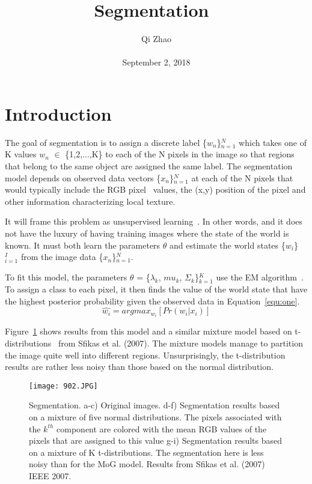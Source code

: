 \documentclass[10pt,twocolumn,letterpaper]{article}
\begin{document}
\title{Segmentation~\cite{Long2017Fully}}
\author{Qi Zhao\\\\September 2, 2018}

\maketitle
\section{Introduction}
 The goal of segmentation is to assign a discrete label \{$w_n$\}$^N_{n=1}$ which takes one of K values $w_n$ $\in$ \{1,2,...,K\} to each of the N pixels in the image so that regions that belong to the same object are assigned the same label. The segmentation model depends on observed data vectors \{$x_n$\}$^N_{n=1}$ at each of the N pixels that would typically include the RGB pixel~\cite{Kester2013Image} values, the (x,y) position of the pixel and other information characterizing local texture.

 It will frame this problem as unsupervised learning~\cite{Hofmann2001Unsupervised}. In other words, and it does not have the luxury of having training images where the state of the world is known. It must both learn the parameters $\theta$ and estimate the world states \{$w_i$\}$^I_{i=1}$ from the image data \{$x_n$\}$^N_{n=1}$.

 To fit this model, the parameters $\theta$ = \{$\lambda_k$, $mu_k$, $\Sigma_k$\}$^K_{k=1}$ use the EM algorithm~\cite{Li2017An}. To assign a class to each pixel, it then finds the value of the world state that have the highest posterior probability given the observed data in Equation~\ref{equ:one}.
 \begin{equation}\label{equ:one}
\hat{w_i} = argmax_{w_i}[Pr(w_i|x_i)]
\end{equation}

 Figure~\ref{fig:onecol} shows results from this model and a similar mixture model based on t-distributions~\cite{Li2017Traces} from Sfikas et al. (2007). The mixture models manage to partition the image quite well into different regions. Unsurprisingly, the t-distribution results are rather less noisy than those based on the normal distribution.
\begin{figure}[H]
\centering
\texttt{[image: 902.JPG]}
 \caption{  Segmentation. a-c) Original images. d-f) Segmentation results based on a mixture of five normal distributions. The pixels associated with the $k^{th}$ component are colored with the mean RGB values of the pixels that are assigned to this value g-i) Segmentation results based on a mixture of K t-distributions. The segmentation here is less noisy than for the MoG model. Results from Sfikas et al. (2007)  IEEE 2007.}
\label{fig:onecol}
\end{figure}


{\small


}
\end{document}
